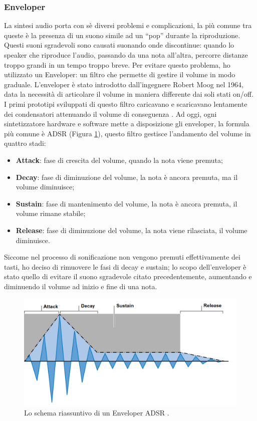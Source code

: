 \subsubsection{Enveloper}
La sintesi audio porta con sè diversi problemi e complicazioni, la più comune tra queste è la presenza di un suono simile ad un “pop” durante la riproduzione.
Questi suoni sgradevoli sono causati suonando onde discontinue: quando lo speaker che riproduce l'audio, passando da una nota all'altra, percorre distanze troppo grandi in un tempo troppo breve.
Per evitare questo problema, ho utilizzato un Enveloper: un filtro che permette di gestire il volume in modo graduale.
L'enveloper è stato introdotto dall'ingegnere Robert Moog nel 1964, data la necessità di articolare il volume in maniera differente dai soli stati on/off.
I primi prototipi sviluppati di questo filtro caricavano e scaricavano lentamente dei condensatori attenuando il volume di conseguenza \cite{enveloper}.
Ad oggi, ogni sintetizzatore hardware e software mette a disposizione gli enveloper, la formula più comune è ADSR (Figura \ref{fig:asdr}), questo filtro gestisce l'andamento del volume in quattro stadi:
\begin{itemize}
    \item \textbf{Attack}: fase di crescita del volume, quando la nota viene premuta;
    \item \textbf{Decay}: fase di diminuzione del volume, la nota è ancora premuta, ma il volume diminuisce;
    \item \textbf{Sustain}: fase di mantenimento del volume, la nota è ancora premuta, il volume rimane stabile;
    \item \textbf{Release}: fase di diminuzione del volume, la nota viene rilasciata, il volume diminuisce.  
\end{itemize}
Siccome nel processo di sonificazione non vengono premuti effettivamente dei tasti, ho deciso di rimuovere le fasi di decay e sustain;
lo scopo dell'enveloper è stato quello di evitare il suono sgradevole citato precedentemente, aumentando e diminuendo il volume ad inizio e fine di una nota.
\begin{figure}[H]
    \includegraphics[width=\linewidth,scale=0.2]{img/adsr.PNG}
    \caption{Lo schema riassuntivo di un Enveloper ADSR \cite{env_img}.}
    \label{fig:asdr}
\end{figure}

